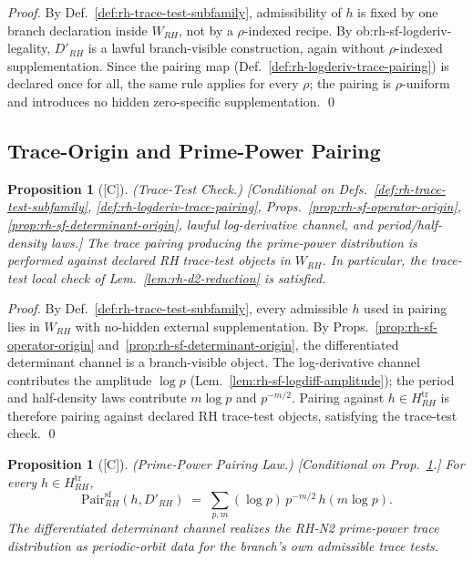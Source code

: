 \documentclass[12pt,oneside]{amsbook}
\theoremstyle{plain}
\newtheorem{proposition}[theorem]{Proposition}
\theoremstyle{definition}
\theoremstyle{remark}
\newcommand{\status}[1]{\textup{[#1]}}
\begin{document}
\begin{proof}
By Def.~\ref{def:rh-trace-test-subfamily}, admissibility of $h$ is
fixed by one branch declaration inside $W_{RH}$, not by a
$\rho$-indexed recipe. By ob:rh-sf-logderiv-legality,
$D'_{RH}$ is a lawful branch-visible construction, again without
$\rho$-indexed supplementation. Since the pairing map
(Def.~\ref{def:rh-logderiv-trace-pairing}) is declared once for all,
the same rule applies for every $\rho$; the pairing is $\rho$-uniform
and introduces no hidden zero-specific supplementation. \qed
\end{proof}

\subsection{Trace-Origin and Prime-Power Pairing}

\begin{proposition}[\status{C}]\label{prop:rh-sf-trace-test-origin}
\textup{(Trace-Test Check.)}
\textup{[Conditional on Defs.~\ref{def:rh-trace-test-subfamily},
\ref{def:rh-logderiv-trace-pairing}, Props.~\ref{prop:rh-sf-operator-origin},
\ref{prop:rh-sf-determinant-origin}, lawful log-derivative channel,
and period/half-density laws.]}
The trace pairing producing the prime-power distribution is performed
against declared RH trace-test objects in $W_{RH}$. In particular,
the trace-test local check of Lem.~\ref{lem:rh-d2-reduction} is
satisfied.
\end{proposition}

\begin{proof}
By Def.~\ref{def:rh-trace-test-subfamily}, every admissible $h$ used
in pairing lies in $W_{RH}$ with no-hidden external supplementation.
By Props.~\ref{prop:rh-sf-operator-origin}
and~\ref{prop:rh-sf-determinant-origin}, the differentiated
determinant channel is a branch-visible object. The log-derivative
channel contributes the amplitude $\log p$ (Lem.~\ref{lem:rh-sf-logdiff-amplitude});
the period and half-density laws contribute $m\log p$ and $p^{-m/2}$.
Pairing against $h \in H_{RH}^{\mathrm{tr}}$ is therefore pairing
against declared RH trace-test objects, satisfying the trace-test
check. \qed
\end{proof}

\begin{proposition}[\status{C}]\label{prop:rh-sf-primepower-pairing}
\textup{(Prime-Power Pairing Law.)}
\textup{[Conditional on Prop.~\ref{prop:rh-sf-trace-test-origin}.]}
For every $h \in H_{RH}^{\mathrm{tr}}$,
\[
 \mathrm{Pair}_{RH}^{\mathrm{sf}}(h, D'_{RH})
 \;=\; \sum_{p,m} (\log p)\,p^{-m/2}\,h(m\log p).
\]
The differentiated determinant channel realizes the RH-N2 prime-power
trace distribution as periodic-orbit data for the branch's own
admissible trace tests.
\end{proposition}
\end{document}
